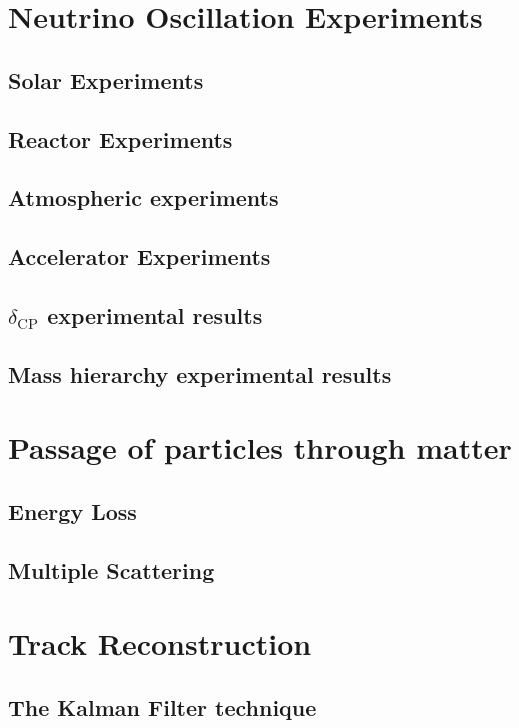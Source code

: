 \section{Neutrino Oscillation Experiments}
\subsection{Solar Experiments}
\subsection{Reactor Experiments}
\subsection{Atmospheric experiments}
\subsection{Accelerator Experiments}
\subsection{$\delta_\textrm{CP}$ experimental results}
\subsection{Mass hierarchy experimental results}
\section{Passage of particles through matter}
\subsection{Energy Loss}
\subsection{Multiple Scattering}
\section{Track Reconstruction}
\subsection{The Kalman Filter technique}

